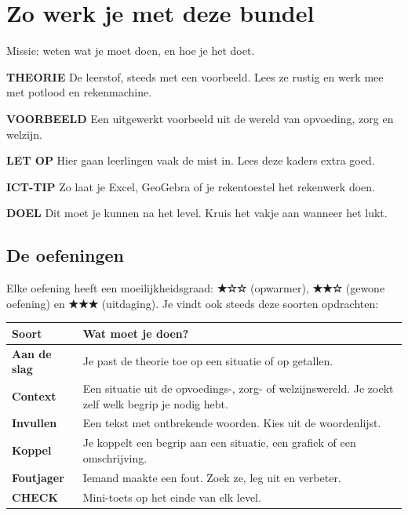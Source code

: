 \pagina

\section{Zo werk je met deze bundel}

\begin{missie}
Missie: weten wat je moet doen, en hoe je het doet.
\end{missie}

\begin{theorie}
\textbf{THEORIE} \quad De leerstof, steeds met een voorbeeld. Lees ze rustig en werk mee met potlood en rekenmachine.
\end{theorie}

\begin{voorbeeld}
\textbf{VOORBEELD} \quad Een uitgewerkt voorbeeld uit de wereld van opvoeding, zorg en welzijn.
\end{voorbeeld}

\begin{letop}
\textbf{LET OP} \quad Hier gaan leerlingen vaak de mist in. Lees deze kaders extra goed.
\end{letop}

\begin{ict}
\textbf{ICT-TIP} \quad Zo laat je Excel, GeoGebra of je rekentoestel het rekenwerk doen.
\end{ict}

\begin{doel}
\textbf{DOEL} \quad Dit moet je kunnen na het level. Kruis het vakje aan wanneer het lukt.
\end{doel}

\subsection*{De oefeningen}

Elke oefening heeft een moeilijkheidsgraad: \textbf{★☆☆} (opwarmer), \textbf{★★☆} (gewone oefening) en \textbf{★★★} (uitdaging). Je vindt ook steeds deze soorten opdrachten:

\begin{tabular}{ll}
\hline
Soort & Wat moet je doen? \\
\hline
\textbf{Aan de slag} & Je past de theorie toe op een situatie of op getallen. \\
\textbf{Context} & Een situatie uit de opvoedings-, zorg- of welzijnswereld. Je zoekt zelf welk begrip je nodig hebt. \\
\textbf{Invullen} & Een tekst met ontbrekende woorden. Kies uit de woordenlijst. \\
\textbf{Koppel} & Je koppelt een begrip aan een situatie, een grafiek of een omschrijving. \\
\textbf{Foutjager} & Iemand maakte een fout. Zoek ze, leg uit en verbeter. \\
\textbf{CHECK} & Mini-toets op het einde van elk level. \\
\hline
\end{tabular}

